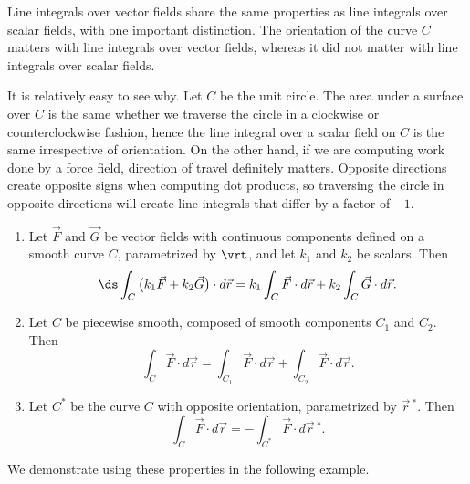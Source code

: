Line integrals over vector fields share the same properties as line integrals over scalar fields, with one important distinction. The orientation of the curve $C$ matters with line integrals over vector fields, whereas it did not matter with line integrals over scalar fields.

It is relatively easy to see why. Let $C$ be the unit circle. The area under a surface over $C$ is the same whether we traverse the circle in a clockwise or counterclockwise fashion, hence the line integral over a scalar field on $C$ is the same irrespective of orientation. On the other hand, if we are computing work done by a force field, direction of travel definitely matters. Opposite directions create opposite signs when computing dot products, so traversing the circle in opposite directions will create line integrals that differ by a factor of $-1$. 

{
\begin{enumerate}
	\item	Let $\vec F$ and $\vec G$ be  vector fields with continuous components defined on a smooth curve $C$, parametrized by $\vrt$, and let $k_1$ and $k_2$ be scalars. Then
	\[
	\ds \int_C\big(k_1\vec F+k_2\vec G\big)\cdot d\vec r = k_1\int_C\vec F\cdot d\vec r +k_2\int_C\vec G\cdot d\vec r.
	\]
	\item Let $C$ be piecewise smooth, composed of smooth components $C_1$ and $C_2$. Then
	\[
	\int_C\vec F\cdot d\vec r = \int_{C_1}\vec F\cdot d\vec r + \int_{C_2}\vec F\cdot d\vec r.
	\]
	\item	Let $C^*$ be the curve $C$ with opposite orientation, parametrized by $\vec r\,^*$. Then
	\[
	\int_C\vec F\cdot d\vec r = -\int_{C^*}\vec F\cdot d\vec r\,^*.
	\]
	\end{enumerate}
}

We demonstrate using these properties in the following example.\\

